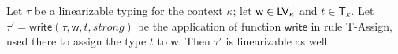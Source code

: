 \begin{lemma}\label{lem:write_invariant}
  Let $\tau$ be a linearizable typing for the context $\kappa$;
  let $\mathsf{w}\in\mathsf{LV}_\kappa$ and $t\in\mathsf{T}_\kappa$.
  Let $\tau'=\mathsf{write}(\tau,\mathsf{w},t,\mathit{strong})$ be
  the application of function $\mathsf{write}$ in rule \textsf{T-Assign},
  used there to assign the type $t$ to $\mathsf{w}$.
  Then $\tau'$ is linearizable as well.
\end{lemma}
